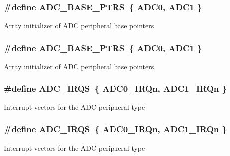\subsubsection[{\texorpdfstring{A\+D\+C\+\_\+\+B\+A\+S\+E\+\_\+\+P\+T\+RS}{ADC_BASE_PTRS}}]{\setlength{\rightskip}{0pt plus 5cm}\#define A\+D\+C\+\_\+\+B\+A\+S\+E\+\_\+\+P\+T\+RS~\{ {\bf A\+D\+C0}, {\bf A\+D\+C1} \}}\hypertarget{group__ADC__Peripheral__Access__Layer_gaaa8175a3a2f4efaceeed5bd26c0b2d3f}{}\label{group__ADC__Peripheral__Access__Layer_gaaa8175a3a2f4efaceeed5bd26c0b2d3f}
Array initializer of A\+DC peripheral base pointers 
\subsubsection[{\texorpdfstring{A\+D\+C\+\_\+\+B\+A\+S\+E\+\_\+\+P\+T\+RS}{ADC_BASE_PTRS}}]{\setlength{\rightskip}{0pt plus 5cm}\#define A\+D\+C\+\_\+\+B\+A\+S\+E\+\_\+\+P\+T\+RS~\{ {\bf A\+D\+C0}, {\bf A\+D\+C1} \}}\hypertarget{group__ADC__Peripheral__Access__Layer_gaaa8175a3a2f4efaceeed5bd26c0b2d3f}{}\label{group__ADC__Peripheral__Access__Layer_gaaa8175a3a2f4efaceeed5bd26c0b2d3f}
Array initializer of A\+DC peripheral base pointers 
\subsubsection[{\texorpdfstring{A\+D\+C\+\_\+\+I\+R\+QS}{ADC_IRQS}}]{\setlength{\rightskip}{0pt plus 5cm}\#define A\+D\+C\+\_\+\+I\+R\+QS~\{ {\bf A\+D\+C0\+\_\+\+I\+R\+Qn}, {\bf A\+D\+C1\+\_\+\+I\+R\+Qn} \}}\hypertarget{group__ADC__Peripheral__Access__Layer_ga87c1a48633af604e5c7c6a64383398b9}{}\label{group__ADC__Peripheral__Access__Layer_ga87c1a48633af604e5c7c6a64383398b9}
Interrupt vectors for the A\+DC peripheral type 
\subsubsection[{\texorpdfstring{A\+D\+C\+\_\+\+I\+R\+QS}{ADC_IRQS}}]{\setlength{\rightskip}{0pt plus 5cm}\#define A\+D\+C\+\_\+\+I\+R\+QS~\{ {\bf A\+D\+C0\+\_\+\+I\+R\+Qn}, {\bf A\+D\+C1\+\_\+\+I\+R\+Qn} \}}\hypertarget{group__ADC__Peripheral__Access__Layer_ga87c1a48633af604e5c7c6a64383398b9}{}\label{group__ADC__Peripheral__Access__Layer_ga87c1a48633af604e5c7c6a64383398b9}
Interrupt vectors for the A\+DC peripheral type 